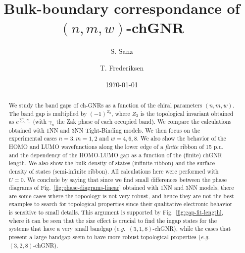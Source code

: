 \documentclass[amsmath,%
amssymb,prb,superscriptaddress]{revtex4}
\newcommand{\Figref}[1]{Fig.~\ref{#1}}
\newcommand{\eg}[1]{\textit{e.g.}}
\begin{document}
\title{Bulk-boundary correspondance of $(n,m,w)$-chGNR}

\author{S. Sanz}

\author{T. Frederiksen}

\date{\today}

\begin{abstract}
We study the band gaps of ch-GNRs as a function of the chiral parameters $(n,m,w)$. The band gap is multiplied by $(-1)^{Z_{2}}$, where $Z_{2}$ is the topological invariant obtained as $e^{\sum_{n}\gamma_{n}}$ (with $\gamma_{n}$ the Zak phase of each occupied band). We compare the calculations obtained with 1NN and 3NN Tight-Binding models. %
We then focus on the experimental cases $n=3, m=1, 2$ and $w=4,6,8$. We also show the behavior of the HOMO and LUMO wavefunctions along the lower edge of a \emph{finite} ribbon of 15 p.u. and the dependency of the HOMO-LUMO gap as a function of the (finite) chGNR length. We also show the bulk density of states (infinite ribbon) and the surface density of states (semi-infinite ribbon). All calculations here were performed with $U=0$. We conclude by saying that since we find small differences between the phase diagrams of \Figref{fig:phase-diagrams-linear} obtained with 1NN and 3NN models, there are some cases where the topoology is not very robust, and hence they are not the best examples to search for topological properties since their qualitative electronic behavior is sensitive to small details. This argument is supported by \Figref{fig:gap-fit-length}, where it can be seen that the size effect is crucial to find the ingap states for the systems that have a very small bandgap (\eg \ \ $(3,1,8)$-chGNR), while the cases that present a large bandgap seem to have more robust topological properties (\eg \ \ $(3,2,8)$-chGNR).
\end{abstract}


\maketitle

%
%
\end{document}
